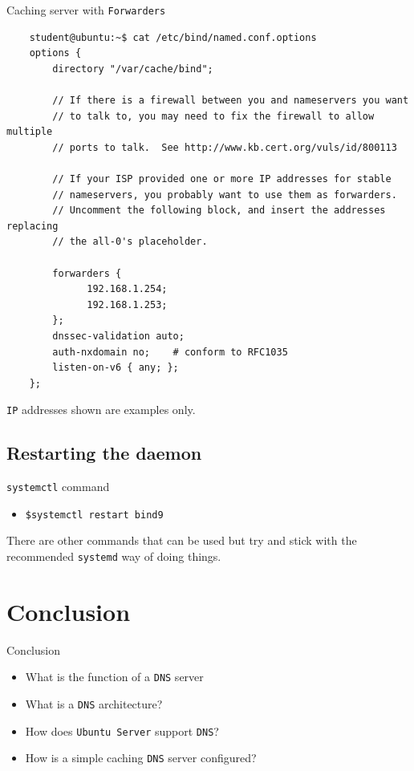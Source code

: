 \documentclass{beamer}
\begin{document}
\begin{frame}[fragile]{Caching server with \texttt{Forwarders}}
  \begin{lstlisting}
    student@ubuntu:~$ cat /etc/bind/named.conf.options
    options {
        directory "/var/cache/bind";

        // If there is a firewall between you and nameservers you want
        // to talk to, you may need to fix the firewall to allow multiple
        // ports to talk.  See http://www.kb.cert.org/vuls/id/800113

        // If your ISP provided one or more IP addresses for stable
        // nameservers, you probably want to use them as forwarders.
        // Uncomment the following block, and insert the addresses replacing
        // the all-0's placeholder.

        forwarders {
 		      192.168.1.254; 
		      192.168.1.253;
        };
        dnssec-validation auto;
        auth-nxdomain no;    # conform to RFC1035
        listen-on-v6 { any; };
    };
  \end{lstlisting}
  \begin{tcolorbox}[title={\textbf{NOTE:}}]
    \begin{center}
      \texttt{IP} addresses shown are examples only.      
    \end{center}
  \end{tcolorbox}
\end{frame}

\subsection{Restarting the daemon}
\begin{frame}{\texttt{systemctl} command}
  \begin{itemize}
    \item \texttt{\$systemctl restart bind9}
  \end{itemize}
  \begin{tcolorbox}[title={\textbf{NOTE:}}]
    There are other commands that can be used but try and stick with the recommended \texttt{systemd} way of doing things.
  \end{tcolorbox} 
\end{frame}

\section*{Conclusion}
\begin{frame}{Conclusion}
  \begin{itemize}
    \item What is the function of a \texttt{DNS} server
    \item What is a \texttt{DNS} architecture?
    \item How does \texttt{Ubuntu Server} support \texttt{DNS}?
    \item How is a simple caching \texttt{DNS} server configured?
  \end{itemize}
\end{frame}
\end{document}
